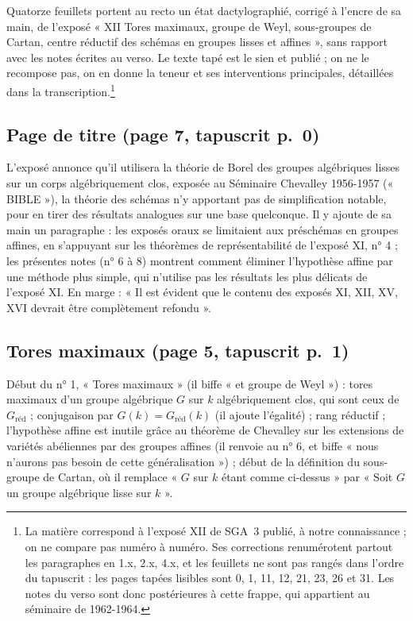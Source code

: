 \documentclass[11pt,a4paper]{article}
\begin{document}
Quatorze feuillets portent au recto un état dactylographié, corrigé à
l'encre de sa main, de l'exposé « XII Tores maximaux, groupe de Weyl,
sous-groupes de Cartan, centre réductif des schémas en groupes lisses et
affines », sans rapport avec les notes écrites au verso. Le texte tapé
est le sien et publié ; on ne le recompose pas, on en donne la teneur
et ses interventions principales, détaillées dans la
transcription.\footnote{La matière correspond à l'exposé XII de SGA~3
publié, à notre connaissance ; on ne compare pas numéro à numéro. Ses
corrections renumérotent partout les paragraphes en 1.x, 2.x, 4.x, et les
feuillets ne sont pas rangés dans l'ordre du tapuscrit : les pages tapées
lisibles sont 0, 1, 11, 12, 21, 23, 26 et 31. Les notes du verso sont donc
postérieures à cette frappe, qui appartient au séminaire de 1962-1964.}

\subsection*{Page de titre (page 7, tapuscrit p.~0)}

L'exposé annonce qu'il utilisera la théorie de Borel des groupes
algébriques lisses sur un corps algébriquement clos, exposée au Séminaire
Chevalley 1956-1957 (« BIBLE »), la théorie des schémas n'y
apportant pas de simplification notable, pour en tirer des résultats
analogues sur une base quelconque. Il y ajoute de sa main un paragraphe :
les exposés oraux se limitaient aux préschémas en groupes affines, en
s'appuyant sur les théorèmes de représentabilité de l'exposé XI, n° 4 ; les
présentes notes (n° 6 à 8) montrent comment éliminer l'hypothèse affine
par une méthode plus simple, qui n'utilise pas les résultats les plus
délicats de l'exposé XI. En marge : « Il est évident que le contenu des
exposés XI, XII, XV, XVI devrait être complètement refondu ».

\subsection*{Tores maximaux (page 5, tapuscrit p.~1)}

Début du n° 1, « Tores maximaux » (il biffe
« et groupe de Weyl ») : tores maximaux d'un groupe algébrique $G$ sur
$k$ algébriquement clos, qui sont ceux de $G_{\text{réd}}$ ; conjugaison
par $G(k) = G_{\text{réd}}(k)$ (il ajoute l'égalité) ; rang réductif ;
l'hypothèse affine est inutile grâce au théorème de Chevalley sur les
extensions de variétés abéliennes par des groupes affines (il renvoie au
n° 6, et biffe « nous n'aurons pas besoin de cette généralisation ») ;
début de la définition du sous-groupe de Cartan, où il remplace « $G$
sur $k$ étant comme ci-dessus » par « Soit $G$ un groupe algébrique
lisse sur $k$ ».
\end{document}
